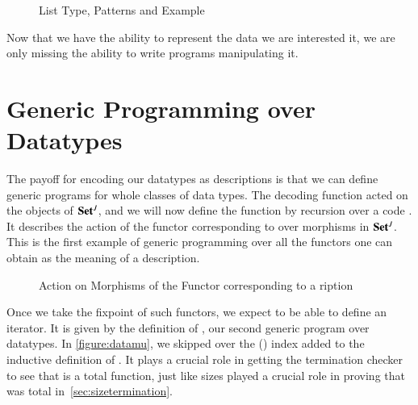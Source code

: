\begin{figure}[h]
\begin{minipage}{0.5\textwidth}
\end{minipage}\begin{minipage}{0.5\textwidth}
\end{minipage}

\begin{minipage}{0.5\textwidth}
\end{minipage}\begin{minipage}{0.5\textwidth}
\end{minipage}
\caption{List Type, Patterns and Example}\label{figure:listpat}
\end{figure}

Now that we have the ability to represent the data we are interested it,
we are only missing the ability to write programs manipulating it.

\section{Generic Programming over Datatypes}

The payoff for encoding our datatypes as descriptions is that we can
define generic programs for whole classes of data types. The decoding
function  acted on the objects of ${\mathbf{Set}}{}^J$, and we will now
define the function  by recursion over a code .
It describes the action of the functor corresponding to  over
morphisms in ${\mathbf{Set}}{}^J$. This is the first example of generic
programming over all the functors one can obtain as the meaning
of a description.

\begin{figure}[h]
\caption{Action on Morphisms of the Functor corresponding to a ription\label{fig:fmapD}}
\end{figure}

Once we take the fixpoint of such functors, we expect to be able to define
an iterator. It is given by the definition of  , our second
generic program over datatypes. In \cref{figure:datamu}, we skipped over
the  (\cite{DBLP:journals/corr/abs-1012-4896}) index added to the
inductive definition of . It plays a crucial role in getting the
termination checker to see that  is a total function, just like
sizes played a crucial role in proving that 
was total in~\cref{sec:sizetermination}.

